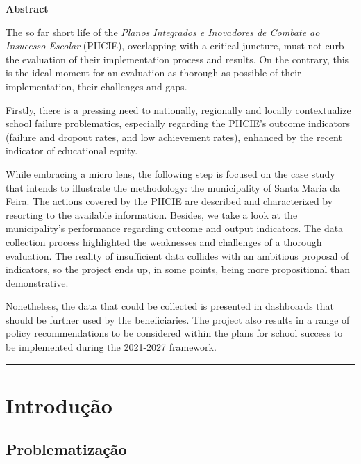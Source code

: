 \documentclass[
]{book}
\begin{document}
\textbf{Abstract}

The so far short life of the \emph{Planos Integrados e Inovadores de Combate ao Insucesso Escolar} (PIICIE), overlapping with a critical juncture, must not curb the evaluation of their implementation process and results. On the contrary, this is the ideal moment for an evaluation as thorough as possible of their implementation, their challenges and gaps.

Firstly, there is a pressing need to nationally, regionally and locally contextualize school failure problematics, especially regarding the PIICIE's outcome indicators (failure and dropout rates, and low achievement rates), enhanced by the recent indicator of educational equity.

While embracing a micro lens, the following step is focused on the case study that intends to illustrate the methodology: the municipality of Santa Maria da Feira. The actions covered by the PIICIE are described and characterized by resorting to the available information. Besides, we take a look at the municipality's performance regarding outcome and output indicators. The data collection process highlighted the weaknesses and challenges of a thorough evaluation. The reality of insufficient data collides with an ambitious proposal of indicators, so the project ends up, in some points, being more propositional than demonstrative.

Nonetheless, the data that could be collected is presented in dashboards that should be further used by the beneficiaries. The project also results in a range of policy recommendations to be considered within the plans for school success to be implemented during the 2021-2027 framework.

\begin{center}\rule{0.5\linewidth}{0.5pt}\end{center}

\hypertarget{introduuxe7uxe3o}{%
\chapter{\texorpdfstring{\textbf{Introdução}}{Introdução}}\label{introduuxe7uxe3o}}

\hypertarget{problematizauxe7uxe3o}{%
\section{\texorpdfstring{\textbf{Problematização}}{Problematização}}\label{problematizauxe7uxe3o}}
\end{document}
